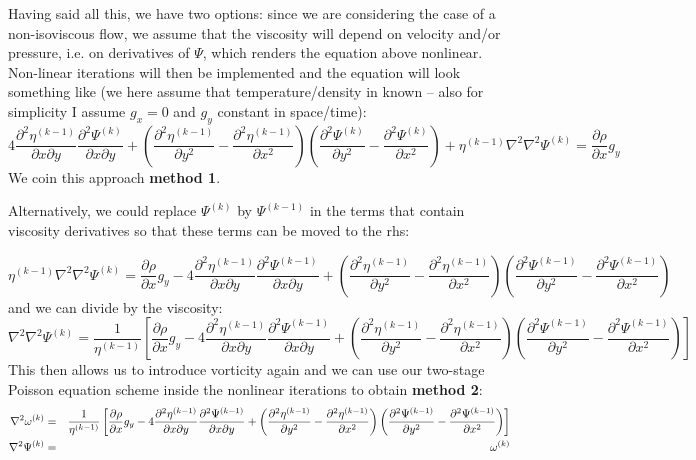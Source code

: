 Having said all this, we have two options: since we are considering the case of a non-isoviscous flow, 
we assume that the viscosity will depend on velocity and/or pressure, i.e. on derivatives of $\Psi$, 
which renders the equation above nonlinear.
Non-linear iterations will then be implemented and the equation will look something like
(we here assume that temperature/density in known -- also for simplicity I assume $g_x=0$ and $g_y$
constant in space/time):
\[
4\frac{\partial^2 \eta^{(k-1)} }{\partial x \partial y} 
\frac{\partial^2 \Psi^{(k)}}{\partial x \partial y} 
+\left( 
\frac{\partial^2 \eta^{(k-1)}}{\partial y^2}
- \frac{\partial^2 \eta^{(k-1)}}{\partial x^2}
\right)
\left( \frac{\partial^2 \Psi^{(k)}}{\partial y^2}-\frac{\partial^2 \Psi^{(k)}}{\partial x^2} \right)
+\eta^{(k-1)} \nabla^2\nabla^2 \Psi^{(k)} 
= 
\frac{\partial \rho}{\partial x} g_y
\]
We coin this approach {\bf method 1}.

Alternatively, we could replace $\Psi^{(k)}$ by $\Psi^{(k-1)}$ in the terms that 
contain viscosity derivatives so that these terms can be moved to the rhs:


\[
\eta^{(k-1)} \nabla^2\nabla^2 \Psi^{(k)} 
= 
\frac{\partial \rho}{\partial x} g_y
-
4\frac{\partial^2 \eta^{(k-1)} }{\partial x \partial y} 
\frac{\partial^2 \Psi^{(k-1)}}{\partial x \partial y} 
+\left( 
\frac{\partial^2 \eta^{(k-1)}}{\partial y^2}
- \frac{\partial^2 \eta^{(k-1)}}{\partial x^2}
\right)
\left( \frac{\partial^2 \Psi^{(k-1)}}{\partial y^2}-\frac{\partial^2 \Psi^{(k-1)}}{\partial x^2} \right)
\]
and we can divide by the viscosity:
\[
\nabla^2\nabla^2 \Psi^{(k)} 
= 
\frac{1}{\eta^{(k-1)} }
\left[
\frac{\partial \rho}{\partial x} g_y
-
4\frac{\partial^2 \eta^{(k-1)} }{\partial x \partial y} 
\frac{\partial^2 \Psi^{(k-1)}}{\partial x \partial y} 
+\left( 
\frac{\partial^2 \eta^{(k-1)}}{\partial y^2}
- \frac{\partial^2 \eta^{(k-1)}}{\partial x^2}
\right)
\left( \frac{\partial^2 \Psi^{(k-1)}}{\partial y^2}-\frac{\partial^2 \Psi^{(k-1)}}{\partial x^2} \right)
\right]
\]
This then allows us to introduce vorticity again and we can use our two-stage Poisson equation scheme
inside the nonlinear iterations  to obtain {\bf method 2}:
\begin{eqnarray}
\nabla^2 \omega^{(k)} 
&=& 
\frac{1}{\eta^{(k-1)} }
\left[
\frac{\partial \rho}{\partial x} g_y
-
4\frac{\partial^2 \eta^{(k-1)} }{\partial x \partial y} 
\frac{\partial^2 \Psi^{(k-1)}}{\partial x \partial y} 
+\left( 
\frac{\partial^2 \eta^{(k-1)}}{\partial y^2}
- \frac{\partial^2 \eta^{(k-1)}}{\partial x^2}
\right)
\left( \frac{\partial^2 \Psi^{(k-1)}}{\partial y^2}-\frac{\partial^2 \Psi^{(k-1)}}{\partial x^2} \right)
\right] \nonumber\\
\nabla^2 \Psi^{(k)} &=& \omega^{(k)}
\end{eqnarray}






